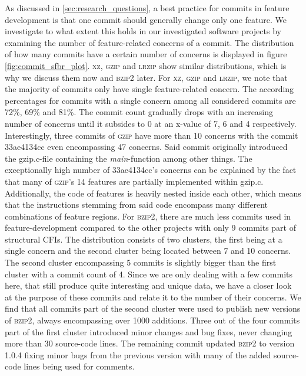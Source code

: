 As discussed in \ref{sec:research_questions}, a best practice for commits in feature development is that one commit should generally change only one feature.
We investigate to what extent this holds in our investigated software projects by examining the number of feature-related concerns of a commit.
The distribution of how many commits have a certain number of concerns is displayed in figure \ref{fig:commit_sfbr_plot}.
\textsc{xz}, \textsc{gzip} and \textsc{lrzip} show similar distributions, which is why we discuss them now and \textsc{bzip2} later.
For \textsc{xz}, \textsc{gzip} and \textsc{lrzip}, we note that the majority of commits only have single feature-related concern.
The according percentages for commits with a single concern among all considered commits are 72\%, 69\% and 81\%.
The commit count gradually drops with an increasing number of concerns until it subsides to 0 at an x-value of 7, 6 and 4 respectively.
Interestingly, three commits of \textsc{gzip} have more than 10 concerns with the commit \textsf{33ae4134cc} even encompassing 47 concerns.
Said commit originally introduced the \textsf{gzip.c}-file containing the \textsl{main}-function among other things.
The exceptionally high number of \textsf{33ae4134cc}'s concerns can be explained by the fact that many of \textsc{gzip}'s 14 features are partially implemented within \textsf{gzip.c}.
Additionally, the code of features is heavily nested inside each other, which means that the instructions stemming from said code encompass many different combinations of feature regions.
For \textsc{bzip2}, there are much less commits used in feature-development compared to the other projects with only 9 commits part of structural CFIs.
The distribution consists of two clusters, the first being at a single concern and the second cluster being located between 7 and 10 concerns.
The second cluster encompassing 5 commits is slightly bigger than the first cluster with a commit count of 4.
Since we are only dealing with a few commits here, that still produce quite interesting and unique data, we have a closer look at the purpose of these commits and relate it to the number of their concerns.
We find that all commits part of the second cluster were used to publish new versions of \textsc{bzip2}, always encompassing over 1000 additions.
Three out of the four commits part of the first cluster introduced minor changes and bug fixes, never changing more than 30 source-code lines.
The remaining commit updated \textsc{bzip2} to version 1.0.4 fixing minor bugs from the previous version with many of the added source-code lines being used for comments. 

